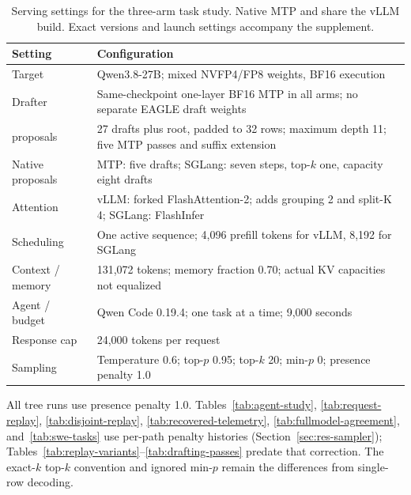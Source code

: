 \begin{table}[!htbp]
\caption{Serving settings for the three-arm task study. Native MTP and \sys{} share the vLLM build. Exact versions and launch settings accompany the supplement.}
\label{tab:serving-config}
\centering\footnotesize
\renewcommand{\arraystretch}{1.12}
\begin{tabularx}{\columnwidth}{@{}>{\raggedright\arraybackslash}p{}Y@{}}
\toprule
Setting & Configuration \\
\midrule
Target & Qwen3.8-27B; mixed NVFP4/FP8 weights, BF16 execution \\
Drafter & Same-checkpoint one-layer BF16 MTP in all arms; no separate EAGLE draft weights \\
\sys{} proposals & 27 drafts plus root, padded to 32 rows; maximum depth 11; five MTP passes and suffix extension \\
Native proposals & MTP: five drafts; SGLang: seven steps, top-$k$ one, capacity eight drafts \\
Attention & vLLM: forked FlashAttention-2; \sys{} adds grouping 2 and split-K 4; SGLang: FlashInfer \\
Scheduling & One active sequence; 4,096 prefill tokens for vLLM, 8,192 for SGLang \\
Context / memory & 131,072 tokens; memory fraction 0.70; actual KV capacities not equalized \\
Agent / budget & Qwen Code 0.19.4; one task at a time; 9,000 seconds \\
Response cap & 24,000 tokens per request \\
Sampling & Temperature 0.6; top-$p$ 0.95; top-$k$ 20; min-$p$ 0; presence penalty 1.0 \\
\bottomrule
\end{tabularx}
\end{table}

All tree runs use presence penalty 1.0. Tables~\ref{tab:agent-study}, \ref{tab:request-replay}, \ref{tab:disjoint-replay}, \ref{tab:recovered-telemetry}, \ref{tab:fullmodel-agreement}, and~\ref{tab:swe-tasks} use per-path penalty histories (Section~\ref{sec:res-sampler}); Tables~\ref{tab:replay-variants}--\ref{tab:drafting-passes} predate that correction. The exact-$k$ top-$k$ convention and ignored min-$p$ remain the differences from single-row decoding.
